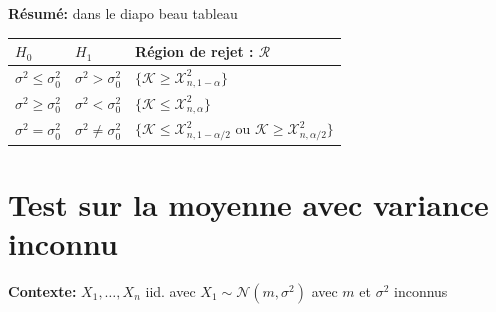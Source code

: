 \documentclass{article}
\theoremstyle{plain}%
\theoremstyle{definition}
\theoremstyle{remark}
\begin{document}
\textbf{Résumé:} dans le diapo beau tableau
\begin{table}[!ht]
    \centering
    \begin{tabular}{|l|l|l|}
    \hline
        $H_0$ & $H_1$ & Région de rejet : $\mathcal{R}$ \\ \hline
        $ \sigma ^2 \leq \sigma _0^2 $ & $ \sigma ^2 > \sigma _0^2 $ & $ \{\mathcal{K} \geq \mathcal{X}^2_{n,1-\alpha}\} $ \\ \hline
        $ \sigma ^2 \geq \sigma _0^2 $ & $ \sigma ^2 < \sigma _0^2 $ & $ \{\mathcal{K} \leq \mathcal{X}^2_{n,\alpha}\} $ \\ \hline
        $ \sigma ^2 = \sigma _0^2 $ & $ \sigma ^2 \neq \sigma _0^2 $ & $ \{\mathcal{K} \leq  \mathcal{X}^2_{n,1-\alpha/2} \text{ ou } \mathcal{K} \geq  \mathcal{X}^2_{n,\alpha/2}\} $ \\ \hline
    \end{tabular}
\end{table}

\section{Test sur la moyenne avec variance inconnu}
\textbf{Contexte:} $ X_1,\dots, X_n $ iid. avec $ X_1 \sim \mathcal{N}(m, \sigma ^2) $ avec $ m $ et $ \sigma ^2 $  inconnus
\end{document}
